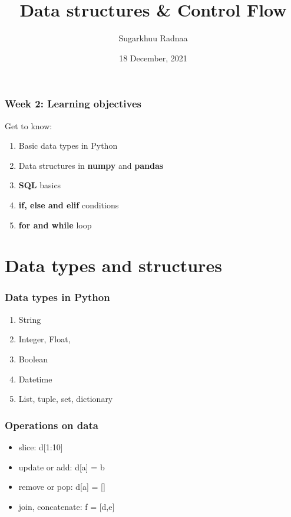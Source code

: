 \documentclass{beamer}
\title[Introduction to Python]{Data structures \& Control Flow}
\author{Sugarkhuu Radnaa}
\institute[]
{
Py4Econ in Ulaanbaatar \\ 
\medskip
\textit{py4econ@gmail.com} 
}
\date{18 December, 2021}  %
\begin{document}
\begin{frame}
\titlepage %
\end{frame}

\begin{frame}
    \frametitle{Week 2: Learning objectives}
    Get to know: 
    \begin{enumerate}
        \item Basic data types in Python
        \item Data structures in \textbf{numpy} and \textbf{pandas}
        \item \textbf{SQL} basics
        \item \textbf{if, else and elif} conditions
        \item \textbf{for and while} loop
    \end{enumerate}
\end{frame}

\section{Data types and structures} 

\begin{frame}
\frametitle{Data types in Python}
    \begin{enumerate}
        \item String
        \item Integer, Float, 
        \item Boolean
        \item Datetime
        \item List, tuple, set, dictionary
    \end{enumerate}
\end{frame}

\begin{frame}
    \frametitle{Operations on data}
        \begin{itemize}
            \item slice: d[1:10]
            \item update or add: d[a] = b
            \item remove or pop: d[a] = [] 
            \item join, concatenate: f = [d,e]
        \end{itemize}
\end{frame}
\end{document}
